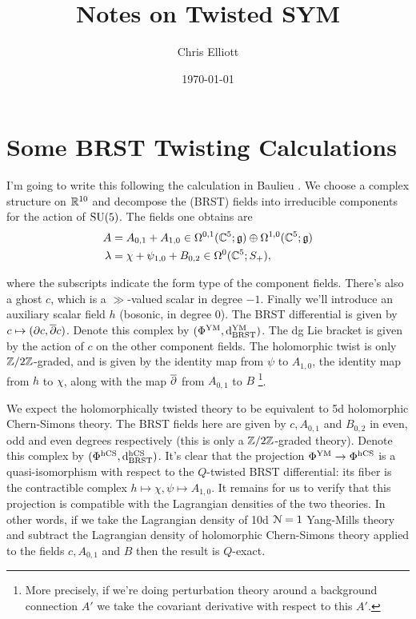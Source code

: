 \documentclass[10pt, oneside]{article}
\title{Notes on Twisted SYM}
\author{Chris Elliott}
\date{\today}
\newcommand{\dBRST}{\mathrm d_{\mathrm{BRST}}}
\begin{document}
\section{Some BRST Twisting Calculations}

\begin{example}[10d $\mc N=1$ Super Yang-Mills]
I'm going to write this following the calculation in Baulieu \cite{Baulieu}.  We choose a complex structure on $\mathbb{R}^{10}$ and decompose the (BRST) fields into irreducible components for the action of $\mathrm{SU}(5)$.  The fields one obtains are
\begin{align*}
A &= A_{0, 1} + A_{1, 0} \in \Omega^{0,1}(\mathbb{C}^5; \mathfrak{g}) \oplus \Omega^{1,0}(\mathbb{C}^5; \mathfrak{g})\\
\lambda &= \chi + \psi_{1, 0} + B_{0, 2} \in \Omega^0(\mathbb{C}^5; S_+),
\end{align*}

where the subscripts indicate the form type of the component fields.  There's also a ghost $c$, which is a $\gg$-valued scalar in degree $-1$.  Finally we'll introduce an auxiliary scalar field $h$ (bosonic, in degree 0).  The BRST differential is given by $c \mapsto (\partial c, \overline{\partial} c)$.  Denote this complex by $(\Phi^{\mr{YM}}, \dBRST^{\mr{YM}})$.  The dg Lie bracket is given by the action of $c$ on the other component fields.  The holomorphic twist is only $\mathbb{Z}/2\mathbb{Z}$-graded, and is given by the identity map from $\psi$ to $A_{1,0}$, the identity map from $h$ to $\chi$, along with the map $\overline{\partial}$ from $A_{0,1}$ to $B$ \footnote{More precisely, if we're doing perturbation theory around a background connection $A'$ we take the covariant derivative with respect to this $A'$.}.  

We expect the holomorphically twisted theory to be equivalent to 5d holomorphic Chern-Simons theory.  The BRST fields here are given by $c, A_{0,1}$ and $B_{0,2}$ in even, odd and even degrees respectively (this is only a $\mathbb{Z}/2\mathbb{Z}$-graded theory).  Denote this complex by $(\Phi^{\mr{hCS}},\dBRST^{\mr{hCS}})$.  It's clear that the projection $\Phi^{\mathrm{YM}} \to \Phi^{\mathrm{hCS}}$ is a quasi-isomorphism with respect to the $Q$-twisted BRST differential: its fiber is the contractible complex $h \mapsto \chi, \psi \mapsto A_{1,0}$.  It remains for us to verify that this projection is compatible with the Lagrangian densities of the two theories.  In other words, if we take the Lagrangian density of 10d $\mc N=1$ Yang-Mills theory and subtract the Lagrangian density of holomorphic Chern-Simons theory applied to the fields $c, A_{0,1}$ and $B$ then the result is $Q$-exact.


\end{example}
\end{document}
